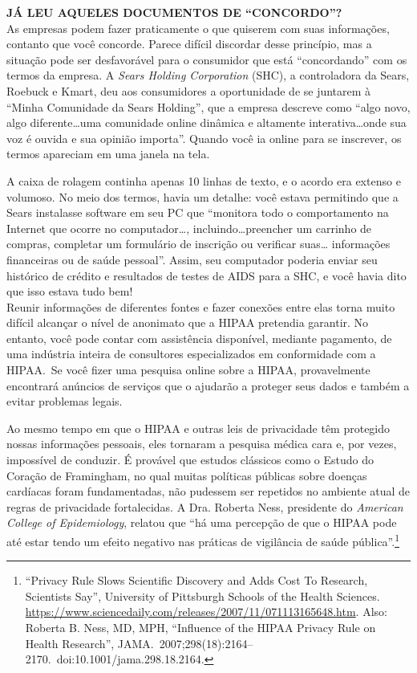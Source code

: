 \documentclass{book}
\newcommand{\ingles}[1]{\textit{#1}}
\begin{document}
\textbf{JÁ LEU AQUELES DOCUMENTOS DE ``CONCORDO''?}\\
As empresas podem fazer praticamente o que quiserem com suas informações,
contanto que você concorde. Parece difícil discordar desse princípio, mas
a situação pode ser desfavorável para o consumidor que está ``concordando''
com os termos da empresa. A \ingles{Sears Holding Corporation} (SHC), a
controladora da Sears, Roebuck e Kmart, deu aos consumidores a oportunidade
de se juntarem à ``Minha Comunidade da Sears Holding'', que a empresa
descreve como ``algo novo, algo diferente\ldots uma comunidade online
dinâmica e altamente interativa\ldots onde sua voz é ouvida e sua opinião
importa''. Quando você ia online para se inscrever, os termos apareciam em
uma janela na tela.

A caixa de rolagem continha apenas 10 linhas de texto, e o acordo era extenso e
volumoso. No meio dos termos, havia um detalhe: você estava permitindo que a
Sears instalasse software em seu PC que ``monitora todo o comportamento na
Internet que ocorre no computador\ldots, incluindo\ldots preencher um carrinho
de compras, completar um formulário de inscrição ou verificar suas\ldots
informações financeiras ou de saúde pessoal''. Assim, seu computador poderia
enviar seu histórico de crédito e resultados de testes de AIDS para a SHC, e
você havia dito que isso estava tudo bem!\\

Reunir informações de diferentes fontes e fazer conexões entre elas torna muito
difícil alcançar o nível de anonimato que a HIPAA pretendia garantir. No
entanto, você pode contar com assistência disponível, mediante pagamento, de
uma indústria inteira de consultores especializados em conformidade com a
HIPAA.~Se você fizer uma pesquisa online sobre a HIPAA, provavelmente
encontrará anúncios de serviços que o ajudarão a proteger seus dados e também a
evitar problemas legais.

Ao mesmo tempo em que o HIPAA e outras leis de privacidade têm protegido nossas
informações pessoais, eles tornaram a pesquisa médica cara e, por vezes,
impossível de conduzir. É provável que estudos clássicos como o Estudo do
Coração de Framingham, no qual muitas políticas públicas sobre doenças
cardíacas foram fundamentadas, não pudessem ser repetidos no ambiente atual de
regras de privacidade fortalecidas. A Dra. Roberta Ness, presidente do
\ingles{American College of Epidemiology}, relatou que ``há uma percepção de
que o HIPAA pode até estar tendo um efeito negativo nas práticas de vigilância
de saúde pública''.\footnote{``Privacy Rule Slows Scientific Discovery and Adds
Cost To Research, Scientists Say'', University of Pittsburgh Schools of the
Health Sciences.
\url{https://www.sciencedaily.com/releases/2007/11/071113165648.htm}. Also:
Roberta B. Ness, MD, MPH, ``Influence of the HIPAA Privacy Rule on Health
Research'', JAMA.~2007;298(18):2164--2170.~doi:10.1001/jama.298.18.2164.}
\end{document}

